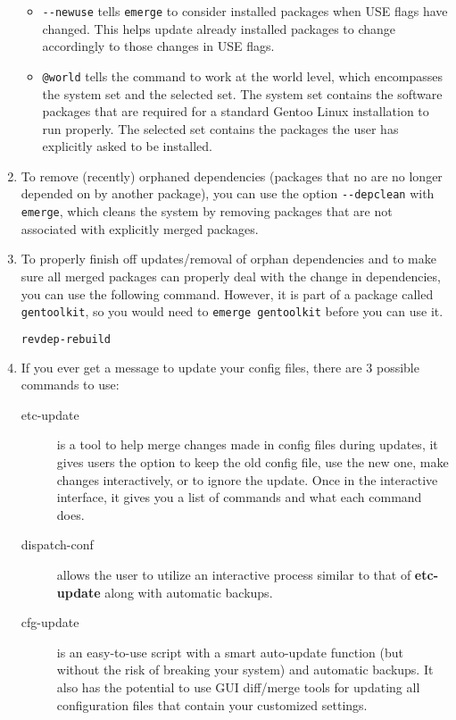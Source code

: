 \documentclass[11pt]{article}
\begin{document}
\begin{enumerate}
\begin{itemize}
       \item \verb|--newuse| tells \verb|emerge| to consider installed packages when USE flags have changed. This helps update already installed packages to change accordingly to those changes in USE flags.
       \item \verb|@world| tells the command to work at the world level, which encompasses the system set and the selected set. The system set contains the software packages that are required for a standard Gentoo Linux installation to run properly. The selected set contains the packages the user has explicitly asked to be installed.
     \end{itemize}
   
     \item To remove (recently) orphaned dependencies (packages that no are no longer depended on by another package), you can use the option \verb|--depclean| with \verb|emerge|, which cleans the system by removing packages that are not associated with explicitly merged packages.
   
     \item To properly finish off updates/removal of orphan dependencies and to make sure all merged packages can properly deal with the change in dependencies, you can use the following command. However, it is part of a package called \verb|gentoolkit|, so you would need to \verb|emerge gentoolkit| before you can use it.
     \begin{lstlisting}[basicstyle=\ttfamily, backgroundcolor = \color{lightgray}, language = bash, xleftmargin = 0cm, framexleftmargin = 1em, framexrightmargin = 1em, showstringspaces=false]
revdep-rebuild
\end{lstlisting}
   
     \item If you ever get a message to update your config files, there are 3 possible commands to use:
     \begin{description}
       \item[etc-update] is a tool to help merge changes made in config files during updates, it gives users the option to keep the old config file, use the new one, make changes interactively, or to ignore the update. Once in the interactive interface, it gives you a list of commands and what each command does.
       \item[dispatch-conf] allows the user to utilize an interactive process similar to that of \textbf{etc-update} along with automatic backups.
       \item[cfg-update] is an easy-to-use script with a smart auto-update function (but without the risk of breaking your system) and automatic backups. It also has the potential to use GUI diff/merge tools for updating all configuration files that contain your customized settings.
     \end{description}
   \end{enumerate}
  
\end{document}
